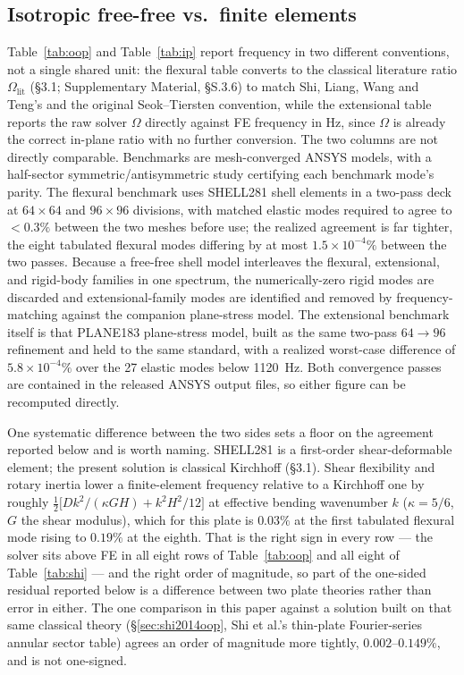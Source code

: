 \documentclass[11pt]{article}
\begin{document}
\subsection{Isotropic free-free vs.\ finite elements}
Table~\ref{tab:oop} and Table~\ref{tab:ip} report frequency in two
different conventions, not a single shared unit: the flexural table
converts to the classical literature ratio $\Omega_{\mathrm{lit}}$
(\S3.1; Supplementary Material, §S.3.6) to match Shi, Liang, Wang and
Teng's and the original Seok--Tiersten convention, while the extensional
table reports the raw solver $\Omega$ directly against FE frequency in
Hz, since $\Omega$ is already the correct in-plane ratio with no further
conversion. The two columns are not directly comparable.
Benchmarks are mesh-converged ANSYS models, with a half-sector
symmetric/antisymmetric study certifying each benchmark mode's parity.
The flexural benchmark uses SHELL281 shell elements in a two-pass deck at
$64\times64$ and $96\times96$ divisions, with matched elastic modes
required to agree to $<0.3\%$ between the two meshes before use; the
realized agreement is far tighter, the eight tabulated flexural modes
differing by at most $1.5\times10^{-4}\%$ between the two passes. Because a
free-free shell model interleaves the flexural, extensional, and
rigid-body families in one spectrum, the numerically-zero rigid modes are
discarded and extensional-family modes are identified and removed by
frequency-matching against the companion plane-stress model. The
extensional benchmark itself is that PLANE183 plane-stress model, built as
the same two-pass $64\to96$ refinement and held to the same standard, with
a realized worst-case difference of $5.8\times10^{-4}\%$ over the 27
elastic modes below 1120~Hz. Both convergence passes are contained in the
released ANSYS output files, so either figure can be recomputed directly.

One systematic difference between the two sides sets a floor on the
agreement reported below and is worth naming. SHELL281 is a first-order
shear-deformable element; the present solution is classical Kirchhoff
(\S3.1). Shear flexibility and rotary inertia lower a finite-element
frequency relative to a Kirchhoff one by roughly
$\tfrac12\big[Dk^2/(\kappa GH)+k^2H^2/12\big]$ at effective bending
wavenumber $k$ ($\kappa=5/6$, $G$ the shear modulus), which for this plate
is $0.03\%$ at the first tabulated flexural mode rising to $0.19\%$ at the
eighth. That is the right sign in every row --- the solver sits above FE in
all eight rows of Table~\ref{tab:oop} and all eight of
Table~\ref{tab:shi} --- and the right order of magnitude, so part of the
one-sided residual reported below is a difference between two plate
theories rather than error in either. The one comparison in this paper
against a solution built on that same classical theory
(\S\ref{sec:shi2014oop}, Shi et al.'s thin-plate Fourier-series annular
sector table) agrees an order of magnitude more tightly,
$0.002$--$0.149\%$, and is not one-signed.
\end{document}

